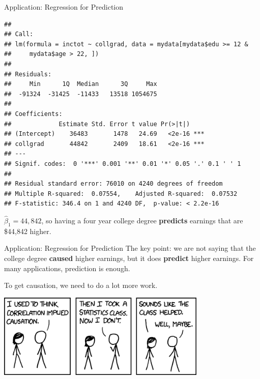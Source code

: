 \documentclass[
  ignorenonframetext,
]{beamer}
\newenvironment{Shaded}{\begin{snugshade}}{\end{snugshade}}
\newcommand{\DecValTok}[1]{\textcolor[rgb]{0.00,0.00,0.81}{#1}}
\newcommand{\KeywordTok}[1]{\textcolor[rgb]{0.13,0.29,0.53}{\textbf{#1}}}
\newcommand{\NormalTok}[1]{#1}
\newcommand{\OperatorTok}[1]{\textcolor[rgb]{0.81,0.36,0.00}{\textbf{#1}}}
\newcommand{\StringTok}[1]{\textcolor[rgb]{0.31,0.60,0.02}{#1}}
\begin{document}
\begin{frame}[fragile]{Application: Regression for Prediction}
\protect\hypertarget{application-regression-for-prediction-8}{}
\tiny

\begin{Shaded}
\end{Shaded}

\begin{verbatim}
## 
## Call:
## lm(formula = inctot ~ collgrad, data = mydata[mydata$edu >= 12 & 
##     mydata$age > 22, ])
## 
## Residuals:
##     Min      1Q  Median      3Q     Max 
##  -91324  -31425  -11433   13518 1054675 
## 
## Coefficients:
##             Estimate Std. Error t value Pr(>|t|)    
## (Intercept)    36483       1478   24.69   <2e-16 ***
## collgrad       44842       2409   18.61   <2e-16 ***
## ---
## Signif. codes:  0 '***' 0.001 '**' 0.01 '*' 0.05 '.' 0.1 ' ' 1
## 
## Residual standard error: 76010 on 4240 degrees of freedom
## Multiple R-squared:  0.07554,    Adjusted R-squared:  0.07532 
## F-statistic: 346.4 on 1 and 4240 DF,  p-value: < 2.2e-16
\end{verbatim}

\normalsize

\(\hat{\beta}_1=44,842\), so having a four year college degree
\textbf{predicts} earnings that are \$44,842 higher.
\end{frame}

\begin{frame}{Application: Regression for Prediction}
\protect\hypertarget{application-regression-for-prediction-9}{}
The key point: we are not saying that the college degree \textbf{caused}
higher earnings, but it does \textbf{predict} higher earnings. For many
applications, prediction is enough.

To get causation, we need to do a lot more work.

\center \includegraphics[width=0.75\textwidth,height=\textheight]{"images/corcauscomic.png"}
\end{frame}
\end{document}
